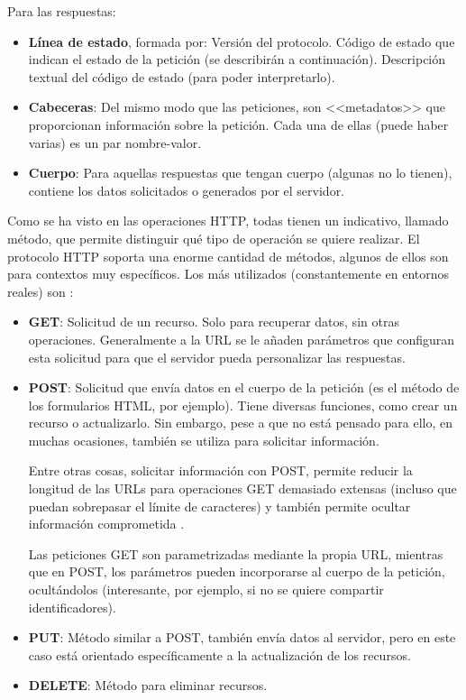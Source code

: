 Para las respuestas:
\begin{itemize}
	\item \textbf{Línea de estado}, formada por:
  \subitem Versión del protocolo.
  \subitem Código de estado que indican el estado de la petición (se describirán a continuación).
  \subitem Descripción textual del código de estado (para poder interpretarlo).
	\item \textbf{Cabeceras}: Del mismo modo que las peticiones, son <<metadatos>> que
  proporcionan información sobre la petición. Cada una de ellas (puede haber
  varias) es un par nombre-valor.
  \item \textbf{Cuerpo}: Para aquellas respuestas que tengan cuerpo (algunas no lo tienen),
  contiene los datos solicitados o generados por el servidor.
\end{itemize}


Como se ha visto en las operaciones HTTP, todas tienen un indicativo, llamado
método, que permite distinguir qué tipo de operación se quiere realizar. El
protocolo HTTP soporta una enorme cantidad de métodos, algunos de ellos son para
contextos muy específicos. Los más utilizados (constantemente en entornos
reales) son \cite{enwiki:1151700575}:
\begin{itemize}
	\item \textbf{GET}: Solicitud de un recurso. Solo para recuperar datos, sin
  otras operaciones. Generalmente a la URL se le añaden parámetros que
  configuran esta solicitud para que el servidor pueda personalizar las
  respuestas.
  \item \textbf{POST}: Solicitud que envía datos en el cuerpo de la petición (es
  el método de los formularios HTML, por ejemplo). Tiene diversas funciones,
  como crear un recurso o actualizarlo. Sin embargo, pese a que no está pensado
  para ello, en muchas ocasiones, también se utiliza para solicitar información.
  
  Entre otras cosas, solicitar información con POST, permite reducir la longitud
  de las URLs para operaciones GET demasiado extensas (incluso que puedan
  sobrepasar el límite de caracteres) y también permite ocultar información
  comprometida \cite{http:postnotget}. 
  
  Las peticiones GET son parametrizadas mediante la propia URL, mientras que en
  POST, los parámetros pueden incorporarse al cuerpo de la petición,
  ocultándolos (interesante, por ejemplo, si no se quiere compartir
  identificadores).
  \item \textbf{PUT}: Método similar a POST, también envía datos al servidor,
  pero en este caso está orientado específicamente a la actualización de los
  recursos.
  \item \textbf{DELETE}: Método para eliminar recursos.
\end{itemize}

